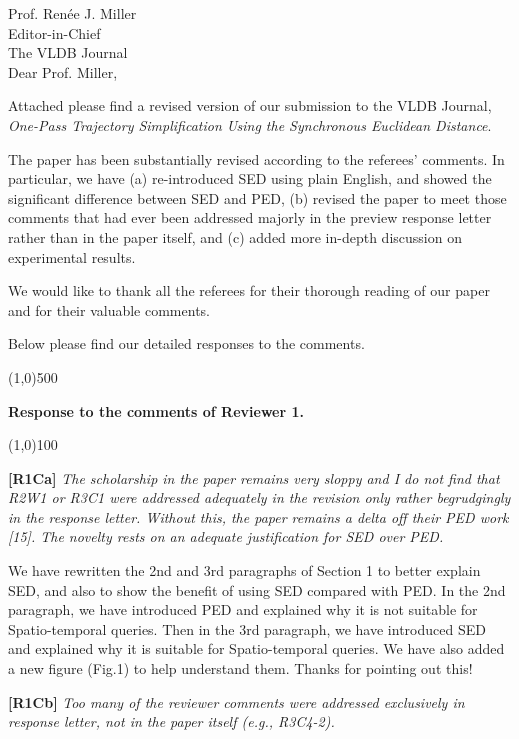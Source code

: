 \documentclass{letter}
\begin{document}
Prof. {Ren{\'{e}}e J. Miller} \\
Editor-in-Chief		\\
The VLDB Journal	\\



Dear Prof. Miller,

Attached please find a revised version of our submission to
the VLDB Journal, \emph{One-Pass Trajectory Simplification Using the Synchronous Euclidean Distance}.


{The paper has been substantially revised according to the referees' comments. In particular, we have (a) re-introduced SED using plain English, and showed the significant difference between SED and PED, (b) revised the paper to meet those comments that had ever been addressed majorly in the preview response letter rather than in the paper itself, and (c) added more in-depth discussion on experimental results.}

We would like to thank all the referees for their thorough reading of our paper and for their valuable comments.

Below please find our detailed responses to the comments.



\line(1,0){500}

\textbf{Response to the comments of Reviewer 1.}

\line(1,0){100}


\textbf{[R1Ca]} \emph{The scholarship in the paper remains very sloppy and I do not find that {R2W1} or {R3C1} were addressed adequately in the revision only rather begrudgingly in the response letter. Without this, the paper remains a delta off their PED work [15]. The novelty rests on an adequate justification for SED over PED.}

We have rewritten the 2nd and 3rd paragraphs of Section 1 to better explain SED, and also to show the benefit of using SED compared with PED. In the 2nd paragraph, we have introduced PED and explained why it is not suitable for Spatio-temporal queries. Then in the 3rd paragraph, we have introduced SED and explained why it is suitable for Spatio-temporal queries. We have also added a new figure (Fig.1) to help understand them. Thanks for pointing out this!


\textbf{[R1Cb]} \emph{Too many of the reviewer comments were addressed exclusively in response letter, not in the paper itself (e.g., {R3C4-2}).}
\end{document}
